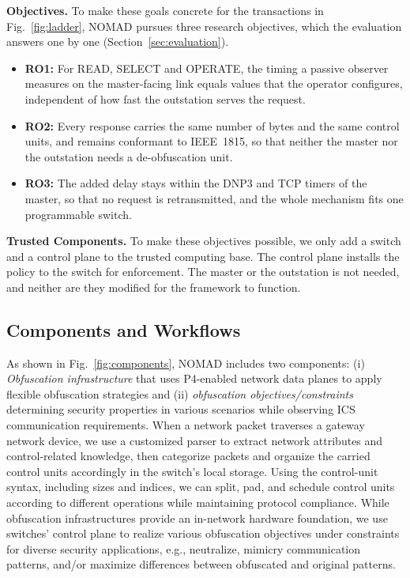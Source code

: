 \documentclass[conference]{IEEEtran}
\begin{document}
\textbf{Objectives.} To make these goals concrete for the transactions in Fig.~\ref{fig:ladder}, NOMAD pursues three research objectives, which the evaluation answers one by one (Section~\ref{sec:evaluation}).
\begin{itemize}[leftmargin=*,labelindent=0pt,topsep=2pt,itemsep=1pt,parsep=0pt]
\item \textbf{RO1:} For READ, SELECT and OPERATE, the timing a passive observer measures on the master-facing link equals values that the operator configures, independent of how fast the outstation serves the request.
\item \textbf{RO2:} Every response carries the same number of bytes and the same control units, and remains conformant to IEEE~1815, so that neither the master nor the outstation needs a de-obfuscation unit.
\item \textbf{RO3:} The added delay stays within the DNP3 and TCP timers of the master, so that no request is retransmitted, and the whole mechanism fits one programmable switch.
\end{itemize}

\textbf{Trusted Components.} To make these objectives possible, we only add a switch and a control plane to the trusted computing base. The control plane installs the policy to the switch for enforcement. The master or the outstation is not needed, and neither are they modified for the framework to function.

\subsection{Components and Workflows}

As shown in Fig.~\ref{fig:components}, NOMAD includes two components: (i) \textit{Obfuscation infrastructure} that uses P4-enabled network data planes to apply flexible obfuscation strategies and (ii) \textit{obfuscation objectives/constraints} determining security properties in various scenarios while observing ICS communication requirements. When a network packet traverses a gateway network device, we use a customized parser to extract network attributes and control-related knowledge, then categorize packets and organize the carried control units accordingly in the switch's local storage. Using the control-unit syntax, including sizes and indices, we can split, pad, and schedule control units according to different operations while maintaining protocol compliance. While obfuscation infrastructures provide an in-network hardware foundation, we use switches' control plane to realize various obfuscation objectives under constraints for diverse security applications, e.g., neutralize, mimicry communication patterns, and/or maximize differences between obfuscated and original patterns.  
\end{document}
